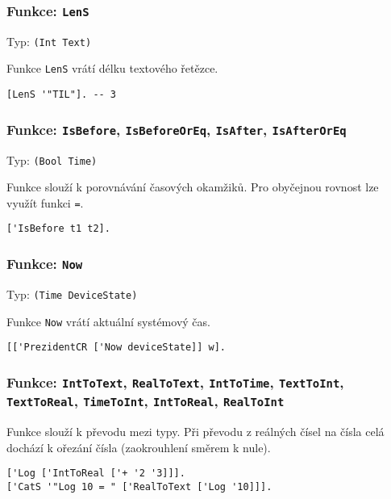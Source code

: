 \subsubsection*{Funkce: \lstinline{LenS}}
Typ: \lstinline{(Int Text)}

Funkce \lstinline{LenS} vrátí délku textového řetězce.

\begin{lstlisting}[caption={Ukázka využití LenS}]
[LenS '"TIL"]. -- 3
\end{lstlisting}

\subsubsection*{Funkce: \lstinline{IsBefore}, \lstinline{IsBeforeOrEq}, \lstinline{IsAfter},
  \lstinline{IsAfterOrEq}}
Typ: \lstinline{(Bool Time)}

Funkce slouží k porovnávání časových okamžiků. Pro obyčejnou rovnost lze využít funkci
\lstinline{=}.

\begin{lstlisting}[caption={Ukázka porovnávání časových okamžiků}]
['IsBefore t1 t2].
\end{lstlisting}

\subsubsection*{Funkce: \lstinline{Now}}
Typ: \lstinline{(Time DeviceState)}

Funkce \lstinline{Now} vrátí aktuální systémový čas.

\begin{lstlisting}[caption={Ukázka využití Now}]
[['PrezidentCR ['Now deviceState]] w].
\end{lstlisting}

\subsubsection*{Funkce: \lstinline{IntToText},
\lstinline{RealToText},
\lstinline{IntToTime},
\lstinline{TextToInt},
\lstinline{TextToReal},
\lstinline{TimeToInt},
\lstinline{IntToReal},
\lstinline{RealToInt}
}

Funkce slouží k převodu mezi typy. Při převodu z reálných čísel na čísla celá dochází k ořezání
čísla (zaokrouhlení směrem k nule).

\begin{lstlisting}[caption={Ukázka využití konverzí}]
['Log ['IntToReal ['+ '2 '3]]].
['CatS '"Log 10 = " ['RealToText ['Log '10]]].
\end{lstlisting}

